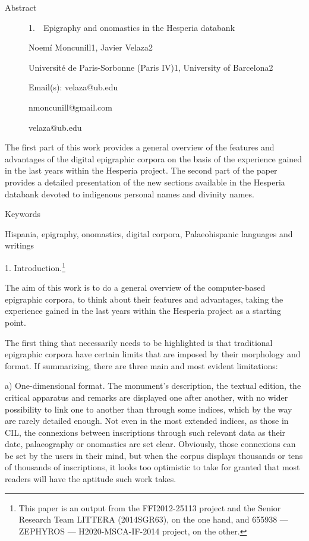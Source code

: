\documentclass[amsthm,ebook]{saparticle}
\title{}
\author{Noemí Moncunill Martí}
\date{2015-11-15}
\begin{document}
Abstract

\begin{figure}
\centering
\begin{minipage}{10.901cm}
1.\ \ Epigraphy and onomastics in the Hesperia databank\newline
\newline


Noemí Moncunill1, Javier Velaza2

Université de Paris-Sorbonne (Paris IV)1, University of Barcelona2

Email(s): velaza@ub.edu 

nmoncunill@gmail.com

velaza@ub.edu


\bigskip
\end{minipage}
\end{figure}
The first part of this work provides a general overview of the features and advantages of the digital epigraphic corpora
on the basis of the experience gained in the last years within the Hesperia project. The second part of the paper
provides a detailed presentation of the new sections available in the Hesperia databank devoted to indigenous personal
names and divinity names.


\bigskip

Keywords

Hispania, epigraphy, onomastics, digital corpora, Palaeohispanic languages and writings


\bigskip


\bigskip


\bigskip

1. Introduction.\footnote{ This paper is an output from the FFI2012-25113 project and the Senior Research Team LITTERA
(2014SGR63), on the one hand, and 655938 — ZEPHYROS — H2020-MSCA-IF-2014 project, on the other.}

The aim of this work is to do a general overview of the computer-based epigraphic corpora, to think about their features
and advantages, taking the experience gained in the last years within the Hesperia project as a starting point.

The first thing that necessarily needs to be highlighted is that traditional epigraphic corpora have certain limits that
are imposed by their morphology and format. If summarizing, there are three main and most evident limitations: 

a) One-dimensional format. The monument's description, the textual edition, the critical apparatus and remarks are
displayed one after another, with no wider possibility to link one to another than through some indices, which by the
way are rarely detailed enough. Not even in the most extended indices, as those in CIL, the connexions between
inscriptions through such relevant data as their date, palaeography or onomastics are set clear. Obviously, those
connexions can be set by the users in their mind, but when the corpus displays thousands or tens of thousands of
inscriptions, it looks too optimistic to take for granted that most readers will have the aptitude such work takes.
\end{document}
